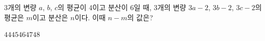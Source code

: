 3개의 변량 $a$, $b$, $c$의 평균이 4이고 분산이 6일 때, 3개의 변량 $3a-2$, $3b-2$, $3c-2$의 평균은 $m$이고 분산은 $n$이다. 이때 $n-m$의 값은?
\begin{choices32}{$44$}{$45$}{$46$}{$47$}{$48$}\end{choices32}
